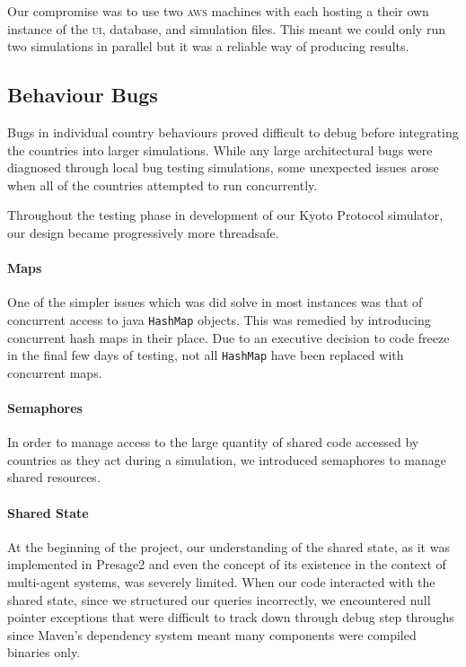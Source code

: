 Our compromise was to use two \textsc{aws} machines with each hosting a their own instance of the \textsc{ui}, database, and simulation files.  This meant we could only run two simulations in parallel but it was a reliable way of producing results.

\subsection{Behaviour Bugs}

Bugs in individual country behaviours proved difficult to debug before integrating the countries into larger simulations. While any large architectural bugs were diagnosed through local bug testing simulations, some unexpected issues arose when all of the countries attempted to run concurrently.

Throughout the testing phase in development of our Kyoto Protocol simulator, our design became progressively more threadsafe.

\paragraph{Maps} 
One of the simpler issues which was did solve in most instances was that of concurrent access to java \texttt{HashMap} objects. This was remedied by introducing concurrent hash maps in their place. Due to an executive decision to code freeze in the final few days of testing, not all \texttt{HashMap} have been replaced with concurrent maps.

\paragraph{Semaphores}
In order to manage access to the large quantity of shared code accessed by countries as they act during a simulation, we introduced semaphores to manage shared resources.

\paragraph{Shared State}
At the beginning of the project, our understanding of the shared state, as it was implemented in Presage2 and even the concept of its existence in the context of multi-agent systems, was severely limited. When our code interacted with the shared state, since we structured our queries incorrectly, we encountered null pointer exceptions that were difficult to track down through debug step throughs since Maven's dependency system meant many components were compiled binaries only.

